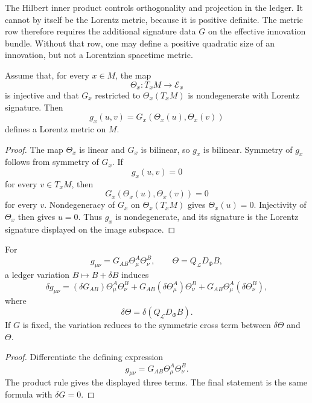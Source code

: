 \begin{principle}
\label{prin:innovation-soldering-hilbert-norm-not-lorentz-metric}
The Hilbert inner product controls orthogonality and projection in the
ledger. It cannot by itself be the Lorentz metric, because it is positive
definite. The metric row therefore requires the additional signature
data $G$ on the effective innovation bundle. Without that row, one may
define a positive quadratic size of an innovation, but not a Lorentzian
spacetime metric.
\end{principle}

\begin{theorem}
\label{thm:innovation-soldering-one-form-lorentz-metric}
Assume that, for every $x\in M$, the map
$$
\Theta_x:T_xM\to\mathcal E_x
$$
is injective and that $G_x$ restricted to $\Theta_x(T_xM)$ is
nondegenerate with Lorentz signature. Then
$$
g_x(u,v)=G_x(\Theta_x(u),\Theta_x(v))
$$
defines a Lorentz metric on $M$.
\end{theorem}

\begin{proof}
The map $\Theta_x$ is linear and $G_x$ is bilinear, so $g_x$ is bilinear.
Symmetry of $g_x$ follows from symmetry of $G_x$. If
$$
g_x(u,v)=0
$$
for every $v\in T_xM$, then
$$
G_x(\Theta_x(u),\Theta_x(v))=0
$$
for every $v$. Nondegeneracy of $G_x$ on $\Theta_x(T_xM)$ gives
$\Theta_x(u)=0$. Injectivity of $\Theta_x$ then gives $u=0$. Thus $g_x$
is nondegenerate, and its signature is the Lorentz signature displayed on
the image subspace.
\end{proof}

\begin{theorem}
\label{thm:innovation-soldering-metric-variation-through-ledger}
For
$$
g_{\mu\nu}=G_{AB}\Theta^A_{\mu}\Theta^B_{\nu},
\qquad
\Theta=Q_{\mathcal L}D_{\Phi}B,
$$
a ledger variation $B\mapsto B+\delta B$ induces
$$
\delta g_{\mu\nu}
=
(\delta G_{AB})\Theta^A_{\mu}\Theta^B_{\nu}
+
G_{AB}(\delta\Theta^A_{\mu})\Theta^B_{\nu}
+
G_{AB}\Theta^A_{\mu}(\delta\Theta^B_{\nu}),
$$
where
$$
\delta\Theta=\delta(Q_{\mathcal L}D_{\Phi}B).
$$
If $G$ is fixed, the variation reduces to the symmetric cross term
between $\delta\Theta$ and $\Theta$.
\end{theorem}

\begin{proof}
Differentiate the defining expression
$$
g_{\mu\nu}=G_{AB}\Theta^A_{\mu}\Theta^B_{\nu}.
$$
The product rule gives the displayed three terms. The final statement is
the same formula with $\delta G=0$.
\end{proof}


